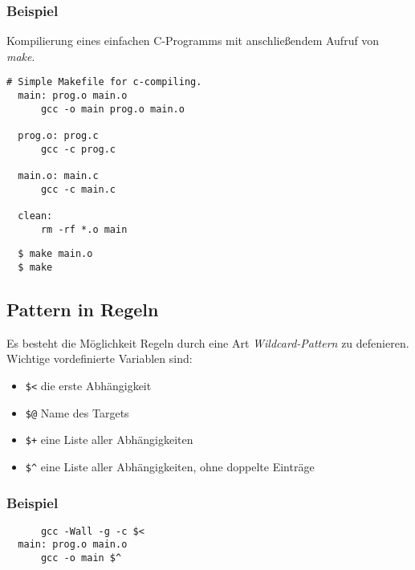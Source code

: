 \documentclass{scrartcl}
\begin{document}
\subsubsection{Beispiel}
\label{sec:beispiel-1}

Kompilierung eines einfachen C-Programms mit anschließendem Aufruf von
\emph{make}.

\begin{lstlisting}[frame=single]
  # Simple Makefile for c-compiling.
  main: prog.o main.o
      gcc -o main prog.o main.o

  prog.o: prog.c
      gcc -c prog.c

  main.o: main.c
      gcc -c main.c

  clean:
      rm -rf *.o main
\end{lstlisting}

\begin{lstlisting}
  $ make main.o
  $ make
\end{lstlisting}

\subsection{Pattern in Regeln}
\label{sec:pattern-regeln}

Es besteht die Möglichkeit Regeln durch eine Art
\emph{Wildcard-Pattern} zu defenieren. Wichtige vordefinierte
Variablen sind:
\begin{itemize}
\item \texttt{\$<} die erste Abhängigkeit
\item \texttt{\$@} Name des Targets
\item \texttt{\$+} eine Liste aller Abhängigkeiten
\item \texttt{\$\^} eine Liste aller Abhängigkeiten, ohne doppelte Einträge
\end{itemize}

\subsubsection{Beispiel}
\label{sec:beispiel-2}

\begin{lstlisting}[frame=single]
  %.o: %.c
      gcc -Wall -g -c $<
  main: prog.o main.o
      gcc -o main $^
\end{lstlisting}
\end{document}
